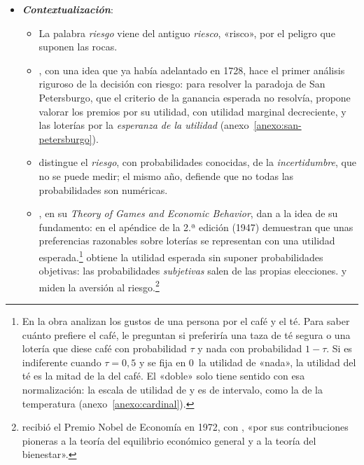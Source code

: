 \documentclass[11pt]{article}
\begin{document}
\begin{itemize}
\item \textbf{\emph{Contextualización}}:
  \begin{itemize}
  \item La palabra \emph{riesgo} viene del antiguo \emph{riesco}, «risco», por el peligro que suponen las rocas\nocite{RAE2026Riesgo}.
  \item \textcite{Bernoulli1738Specimen}, con una idea que ya había adelantado  en 1728, hace el primer análisis riguroso de la decisión con riesgo: para resolver la paradoja de San Petersburgo, que el criterio de la ganancia esperada no resolvía, propone valorar los premios por su utilidad, con utilidad marginal decreciente, y las loterías por la \emph{esperanza de la utilidad} (anexo~\ref{anexo:san-petersburgo}).
  \item \textcite{Knight1921Risk} distingue el \emph{riesgo}, con probabilidades conocidas, de la \emph{incertidumbre}, que no se puede medir; el mismo año, \textcite{Keynes1921Treatise} defiende que no todas las probabilidades son numéricas.
  \item \textcite{VonNeumannMorgenstern1944Theory}, en su \emph{Theory of Games and Economic Behavior}, dan a la idea de  su fundamento: en el apéndice de la 2.ª edición (1947) demuestran que unas preferencias razonables sobre loterías se representan con una utilidad esperada.\footnote{En la obra analizan los gustos de una persona por el café y el té. Para saber cuánto prefiere el café, le preguntan si preferiría una taza de té segura o una lotería que diese café con probabilidad $\tau$ y nada con probabilidad $1-\tau$. Si es indiferente cuando $\tau=0{,}5$ y se fija en 0~la utilidad de «nada», la utilidad del té es la mitad de la del café. El «doble» solo tiene sentido con esa normalización: la escala de utilidad de  y  es de intervalo, como la de la temperatura (anexo~\ref{anexo:cardinal}).} \textcite{Savage1954Foundations} obtiene la utilidad esperada sin suponer probabilidades objetivas: las probabilidades \emph{subjetivas} salen de las propias elecciones. \textcite{Pratt1964Risk} y \textcite{Arrow1965Aspects} miden la aversión al riesgo.\footnote{ recibió el Premio Nobel de Economía en 1972, con , «por sus contribuciones pioneras a la teoría del equilibrio económico general y a la teoría del bienestar»\nocite{Nobel1972HicksArrow}.}

\end{itemize}
\end{itemize}
\end{document}
